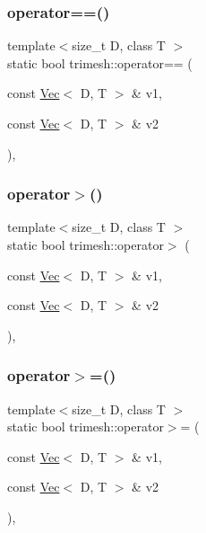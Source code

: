 \subsubsection{\texorpdfstring{operator==()}{operator==()}\hspace{0.1cm}{\footnotesize\ttfamily [3/3]}}
{\footnotesize\ttfamily template$<$size\+\_\+t D, class T $>$ \\
static bool trimesh\+::operator== (\begin{DoxyParamCaption}\item[{const \hyperlink{classtrimesh_1_1Vec}{Vec}$<$ D, T $>$ \&}]{v1,  }\item[{const \hyperlink{classtrimesh_1_1Vec}{Vec}$<$ D, T $>$ \&}]{v2 }\end{DoxyParamCaption})\hspace{0.3cm}{\ttfamily [inline]}, {\ttfamily [static]}}

\mbox{\label{namespacetrimesh_a51a39c2920a3b4f2d36bf41f29da0001}} 
\subsubsection{\texorpdfstring{operator$>$()}{operator>()}}
{\footnotesize\ttfamily template$<$size\+\_\+t D, class T $>$ \\
static bool trimesh\+::operator$>$ (\begin{DoxyParamCaption}\item[{const \hyperlink{classtrimesh_1_1Vec}{Vec}$<$ D, T $>$ \&}]{v1,  }\item[{const \hyperlink{classtrimesh_1_1Vec}{Vec}$<$ D, T $>$ \&}]{v2 }\end{DoxyParamCaption})\hspace{0.3cm}{\ttfamily [inline]}, {\ttfamily [static]}}

\mbox{\label{namespacetrimesh_ae1cbc1884d934c33b1e66dcb38bfb08f}} 
\subsubsection{\texorpdfstring{operator$>$=()}{operator>=()}}
{\footnotesize\ttfamily template$<$size\+\_\+t D, class T $>$ \\
static bool trimesh\+::operator$>$= (\begin{DoxyParamCaption}\item[{const \hyperlink{classtrimesh_1_1Vec}{Vec}$<$ D, T $>$ \&}]{v1,  }\item[{const \hyperlink{classtrimesh_1_1Vec}{Vec}$<$ D, T $>$ \&}]{v2 }\end{DoxyParamCaption})\hspace{0.3cm}{\ttfamily [inline]}, {\ttfamily [static]}}

